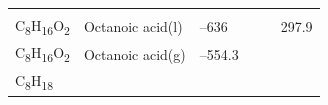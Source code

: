 \documentclass[
]{book}
\theoremstyle{definition}
\theoremstyle{definition}
\theoremstyle{definition}
\theoremstyle{remark}
\begin{document}
\begin{longtable}[]{@{}llllll@{}}
\begin{minipage}[t]{0.15\columnwidth}
\strut
\end{minipage} & \begin{minipage}[t]{0.14\columnwidth}\raggedright
\strut
\end{minipage} & \begin{minipage}[t]{0.14\columnwidth}\raggedright
\strut
\end{minipage}\tabularnewline
\begin{minipage}[t]{0.07\columnwidth}\raggedright
C\textsubscript{8}H\textsubscript{16}O\textsubscript{2}\strut
\end{minipage} & \begin{minipage}[t]{0.17\columnwidth}\raggedright
Octanoic acid(l)\strut
\end{minipage} & \begin{minipage}[t]{0.15\columnwidth}\raggedright
--636\strut
\end{minipage} & \begin{minipage}[t]{0.15\columnwidth}\raggedright
\strut
\end{minipage} & \begin{minipage}[t]{0.14\columnwidth}\raggedright
\strut
\end{minipage} & \begin{minipage}[t]{0.14\columnwidth}\raggedright
297.9\strut
\end{minipage}\tabularnewline
\begin{minipage}[t]{0.07\columnwidth}\raggedright
C\textsubscript{8}H\textsubscript{16}O\textsubscript{2}\strut
\end{minipage} & \begin{minipage}[t]{0.17\columnwidth}\raggedright
Octanoic acid(g)\strut
\end{minipage} & \begin{minipage}[t]{0.15\columnwidth}\raggedright
--554.3\strut
\end{minipage} & \begin{minipage}[t]{0.15\columnwidth}\raggedright
\strut
\end{minipage} & \begin{minipage}[t]{0.14\columnwidth}\raggedright
\strut
\end{minipage} & \begin{minipage}[t]{0.14\columnwidth}\raggedright
\strut
\end{minipage}\tabularnewline
\begin{minipage}[t]{0.07\columnwidth}\raggedright
C\textsubscript{8}H\textsubscript{18}\strut
\end{minipage} & \begin{minipage}[t]{0.17\columnwidth}\raggedright

\end{minipage}
\end{longtable}
\end{document}
